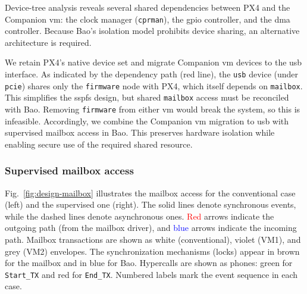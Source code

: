 Device-tree analysis reveals several shared dependencies between PX4 and the
Companion \gls{vm}: the clock manager (\lstinline{cprman}), the \gls{gpio}
controller, and the \gls{dma} controller. Because Bao’s isolation model
prohibits device sharing, an alternative architecture is required.

We retain PX4's native device set and migrate Companion \gls{vm} devices to the
\gls{usb} interface. As indicated by the dependency path (red line), the
\lstinline{usb} device (under \lstinline{pcie}) shares only the
\lstinline{firmware} node with PX4, which itself depends on \lstinline{mailbox}.
This simplifies the \gls{sspfs} design, but shared \lstinline{mailbox} access
must be reconciled with Bao. Removing \lstinline{firmware} from either \gls{vm}
would break the system, so this is infeasible.
%
Accordingly, we combine the Companion \gls{vm} migration to \gls{usb} with
supervised mailbox access in Bao. This preserves hardware isolation while
enabling secure use of the required shared resource.

\subsubsection{Supervised mailbox access}
\label{sec:superv-mailb-access}
Fig.~\ref{fig:design-mailbox} illustrates the mailbox access for the
conventional case (left) and the supervised one (right).
%
The solid lines denote synchronous events, while the dashed lines denote
asynchronous ones.
\textcolor{red}{Red} arrows indicate the outgoing path (from the mailbox
driver), and \textcolor{blue}{blue} arrows indicate the incoming path. Mailbox
transactions are shown as white (conventional), violet (VM1), and grey (VM2)
envelopes. The synchronization mechanisms (locks) appear in brown for the
mailbox and in blue for Bao. Hypercalls are shown as phones: green for
\lstinline{Start_TX} and red for \lstinline{End_TX}. Numbered labels mark the
event sequence in each case.

